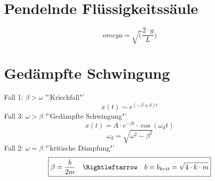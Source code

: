 \section{Pendelnde Flüssigkeitssäule}
\[ \boxed{omega = \sqrt(\frac{2 \cdot g}{L})} \]

\section{Gedämpfte Schwingung}
Fall 1: $\beta > \omega$ "'Kriechfall"'
\[ \boxed{x(t) \sim e^{(-\beta \pm \delta)t}} \]
Fall 3: $\omega > \beta$ "'Gedämpfte Schwingung"'
\[ \boxed{x(t) = A \cdot e^{-\beta t} \cdot \cos(\omega_d t)} \]
\[ \boxed{\omega_d = \sqrt{\omega^2 - \beta^2}} \]
Fall 2: $\omega = \beta$ "'kritische Dämpfung"'
\[ \boxed{\beta = \frac{b}{2 m} \quad \Rightleftarrow \quad 
b = b_{krit} = \sqrt{4 \cdot k \cdot m}} \]